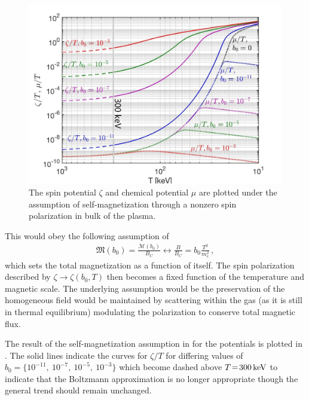\begin{figure}
 \centering
 \includegraphics[width=0.8\linewidth]{plots/Spinchemical_04.jpg}
 \caption{The spin potential $\zeta$ and chemical potential $\mu$ are plotted under the assumption of self-magnetization through a nonzero spin polarization in bulk of the plasma. }
 \label{fig:self} 
\end{figure}

This would obey the following assumption of
\begin{align}
 \label{selfmag}
 {\mathfrak M}(b_{0})=\frac{\mathcal{M}(b_0)}{{B}_{C}}\longleftrightarrow\frac{B}{{B}_{C}}=b_{0}\frac{T^{2}}{m_{e}^{2}}\,,
\end{align}
which sets the total magnetization as a function of itself. The spin polarization described by $\zeta\rightarrow\zeta(b_{0},T)$ then becomes a fixed function of the temperature and magnetic scale. The underlying assumption would be the preservation of the homogeneous field would be maintained by scattering within the gas (as it is still in thermal equilibrium) modulating the polarization to conserve total magnetic flux.

The result of the self-magnetization assumption in  for the potentials is plotted in . The solid lines indicate the curves for $\zeta/T$ for differing values of $b_{0}=\{10^{-11},\ 10^{-7},\ 10^{-5},\ 10^{-3}\}$ which become dashed above $T\!=\!300\text{\,keV}$ to indicate that the Boltzmann approximation is no longer appropriate though the general trend should remain unchanged.

